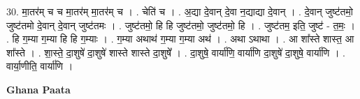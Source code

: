 \documentclass[17pt]{extarticle}
\begin{document}
30. मा॒तर॑म् च च मा॒तर॑म् मा॒तर॑म् च । . चेति॑ च । . अ॒द्या दे॒वान् दे॒वा न॒द्याद्या दे॒वान् । . दे॒वान् जुष्ट॑तमो॒ जुष्ट॑तमो दे॒वान् दे॒वान् जुष्ट॑तमः । . जुष्ट॑तमो॒ हि हि जुष्ट॑तमो॒ जुष्ट॑तमो॒ हि । . जुष्ट॑तम॒ इति॒ जुष्ट॑ - त॒मः॒ । . हि ग॒म्या ग॒म्या हि हि ग॒म्याः । . ग॒म्या अथाथ॑ ग॒म्या ग॒म्या अथ॑ । . अथा ऽथाथा । . आ शा᳚स्ते शास्त॒ आ शा᳚स्ते । . शा॒स्ते॒ दा॒शुषे॑ दा॒शुषे॑ शास्ते शास्ते दा॒शुषे᳚ । . दा॒शुषे॒ वार्या॑णि॒ वार्या॑णि दा॒शुषे॑ दा॒शुषे॒ वार्या॑णि । . वार्या॒णीति॒ वार्या॑णि । \newline

\textbf{Ghana Paata } \newline
\end{document}
